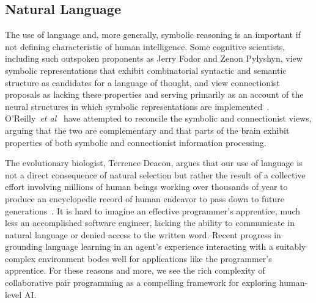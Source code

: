 \documentclass[letterpaper,11pt]{article}
\def\etal{{\em{et al}}}
\begin{document}

\subsection{Natural Language}


The use of language and, more generally, symbolic reasoning is an important if not defining characteristic of human intelligence. Some cognitive scientists, including such outspoken proponents as Jerry Fodor and Zenon Pylyshyn, view symbolic representations that exhibit combinatorial syntactic and semantic structure as candidates for a language of thought, and view connectionist proposals as lacking these properties and serving primarily as an account of the neural structures in which symbolic representations are implemented~\cite{FodorandPylyshynCOGNITION-88,Fodor84}. O'Reilly~\etal{}~\cite{OReillyetalTACO-14} have attempted to reconcile the symbolic and connectionist views, arguing that the two are complementary and that parts of the brain exhibit properties of both symbolic and connectionist information processing. 

The evolutionary biologist, Terrence Deacon, argues that our use of language is not a direct consequence of natural selection but rather the result of a collective effort involving millions of human beings working over thousands of year to produce an encyclopedic record of human endeavor to pass down to future generations~\cite{Deacon1998symbolic}. It is hard to imagine an effective programmer's apprentice, much less an accomplished software engineer, lacking the ability to communicate in natural language or denied access to the written word. Recent progress in grounding language learning in an agent's experience interacting with a suitably complex environment bodes well for applications like the programmer's apprentice. For these reasons and more, we see the rich complexity of collaborative pair programming as a compelling framework for exploring human-level AI.

\end{document}
